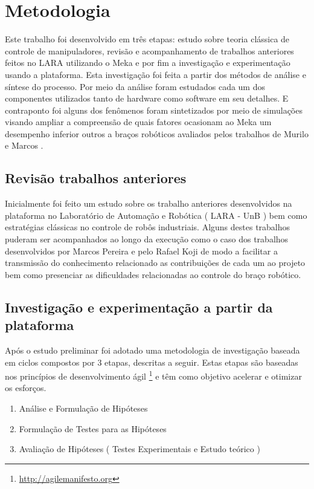 \section{Metodologia}

Este trabalho foi desenvolvido em três etapas: estudo sobre teoria clássica de controle de manipuladores, revisão e acompanhamento de trabalhos anteriores feitos no LARA utilizando o Meka e por fim a investigação e experimentação usando a plataforma. Esta investigação foi feita a partir dos métodos de análise e síntese do processo. Por meio da análise foram estudados cada um dos componentes utilizados tanto de hardware como software em seu detalhes. E contraponto foi alguns dos fenômenos foram sintetizados por meio de simulações visando ampliar a compreensão de quais fatores ocasionam ao Meka um desempenho inferior outros a braços robóticos avaliados pelos trabalhos de Murilo \cite{murlow2014} e Marcos \cite{marcosps2016}.

\subsection{Revisão trabalhos anteriores}

Inicialmente foi feito um estudo sobre os trabalho anteriores desenvolvidos na plataforma no Laboratório de Automação e Robótica ( LARA - UnB ) bem como estratégias clássicas no controle de robôs industriais. Alguns destes trabalhos puderam ser acompanhados ao longo da execução como o caso dos trabalhos desenvolvidos por Marcos Pereira e pelo Rafael Koji de modo a facilitar a transmissão do conhecimento relacionado as contribuições de cada um ao projeto bem como presenciar as dificuldades relacionadas ao controle do braço robótico.

\subsection{Investigação e experimentação a partir da plataforma}

Após o estudo preliminar foi adotado uma metodologia de investigação baseada em ciclos compostos por 3 etapas, descritas a seguir. Estas etapas são baseadas nos princípios de desenvolvimento ágil \footnote{\url{http://agilemanifesto.org}} e têm como objetivo acelerar e otimizar os esforços.


\begin{enumerate}
    \item Análise e Formulação de Hipóteses
    \item Formulação de Testes para as Hipóteses
    \item Avaliação de Hipóteses ( Testes Experimentais e Estudo teórico )
\end{enumerate}

